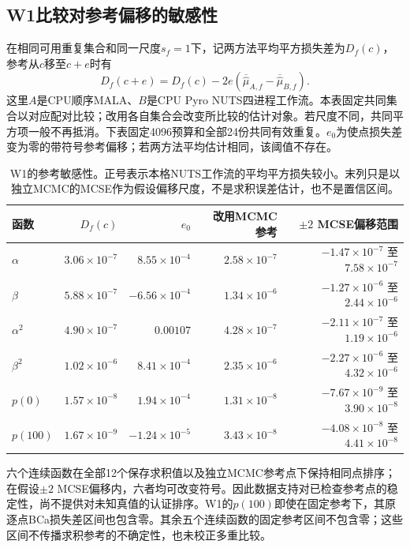 \subsection{W1比较对参考偏移的敏感性}
在相同可用重复集合和同一尺度$s_f=1$下，记两方法平均平方损失差为$D_f(c)$，参考从$c$移至$c+e$时有
\[
D_f(c+e)=D_f(c)-2e\left(\overline{\widehat\mu}_{A,f}-\overline{\widehat\mu}_{B,f}\right).
\]
这里$A$是CPU顺序MALA、$B$是CPU Pyro NUTS四进程工作流。本表固定共同集合以对应配对比较；改用各自集合会改变所比较的估计对象。若尺度不同，共同平方项一般不再抵消。下表固定4096预算和全部24份共同有效重复。$e_0$为使点损失差变为零的带符号参考偏移；若两方法平均估计相同，该阈值不存在。

\begin{table}[htbp]\centering\small
\begin{tabular}{lrrrr}\toprule
函数 & $D_f(c)$ & $e_0$ & 改用MCMC参考 & $\pm2$ MCSE偏移范围\\\midrule
$\alpha$ & $3.06\times10^{-7}$ & $8.55\times10^{-4}$ & $2.58\times10^{-7}$ & $-1.47\times10^{-7}$ 至 $7.58\times10^{-7}$\\
$\beta$ & $5.88\times10^{-7}$ & $-6.56\times10^{-4}$ & $1.34\times10^{-6}$ & $-1.27\times10^{-6}$ 至 $2.44\times10^{-6}$\\
$\alpha^2$ & $4.90\times10^{-7}$ & $0.00107$ & $4.28\times10^{-7}$ & $-2.11\times10^{-7}$ 至 $1.19\times10^{-6}$\\
$\beta^2$ & $1.02\times10^{-6}$ & $8.41\times10^{-4}$ & $2.35\times10^{-6}$ & $-2.27\times10^{-6}$ 至 $4.32\times10^{-6}$\\
$p(0)$ & $1.57\times10^{-8}$ & $1.94\times10^{-4}$ & $1.31\times10^{-8}$ & $-7.67\times10^{-9}$ 至 $3.90\times10^{-8}$\\
$p(100)$ & $1.67\times10^{-9}$ & $-1.24\times10^{-5}$ & $3.43\times10^{-8}$ & $-4.08\times10^{-8}$ 至 $4.41\times10^{-8}$\\
\bottomrule\end{tabular}
\caption{W1的参考敏感性。正号表示本格NUTS工作流的平均平方损失较小。末列只是以独立MCMC的MCSE作为假设偏移尺度，不是求积误差估计，也不是置信区间。}
\label{tab:reference-sensitivity}
\end{table}
六个连续函数在全部12个保存求积值以及独立MCMC参考点下保持相同点排序；在假设$\pm2$ MCSE偏移内，六者均可改变符号。因此数据支持对已检查参考点的稳定性，尚不提供对未知真值的认证排序。W1的$p(100)$即使在固定参考下，其原逐点BCa损失差区间也包含零。其余五个连续函数的固定参考区间不包含零；这些区间不传播求积参考的不确定性，也未校正多重比较。

